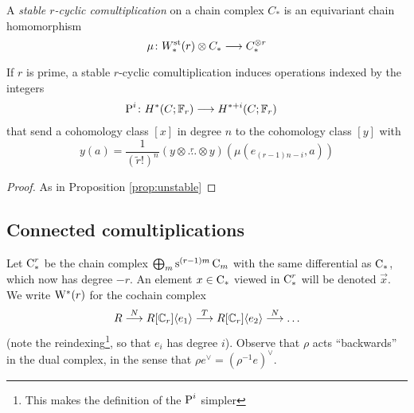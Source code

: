 A \emph{stable $r$-cyclic comultiplication} on a chain complex $C_*$ is an equivariant chain homomorphism
\[
\mu\colon W_*^{\mathrm{st}}(r)\otimes C_*\longrightarrow C_*^{\otimes r}
\]
\begin{proposition}
If $r$ is prime, a stable $r$-cyclic comultiplication induces operations indexed by the integers
\begin{align*}
    \operatorname{P}^{i}\colon H^*(C;\mathbb{F}_r)&\longrightarrow H^{*+i}(C;\mathbb{F}_r)
\end{align*}
that send a cohomology class $[x]$ in degree $n$ to the cohomology class $[y]$ with 
\[
    y(a) = \frac{1}{(\tilde{r}!)^n}(y\otimes \overset{r}{\ldots}\otimes y)(\mu(e_{(r-1)n-i},a))
\]
\end{proposition}
\begin{proof}
    As in Proposition \ref{prop:unstable}
\end{proof}

\subsection{Connected comultiplications}

Let $\operatorname{C}_*^r$ be the chain complex $\bigoplus_m \operatorname{s}^{(r-1)m}\operatorname{C}_m$ with the same differential as $\operatorname{C}_*$, which now has degree $-r$. An element $x\in \operatorname{C}_*$ viewed in $\operatorname{C}_*^r$ will be denoted $\vec{x}$. We write $\mathrm{W}^*(r)$ for the cochain complex
\[
    R\overset{N}{\longrightarrow} R[\mathbb{C}_r]\langle e_1\rangle \overset{T}{\longrightarrow} R[\mathbb{C}_r]\langle e_2\rangle \overset{N}{\longrightarrow} \ldots
\]
(note the reindexing\footnote{This makes the definition of the $\operatorname{P}^i$ simpler}, so that $e_i$ has degree $i$). Observe that $\rho$ acts ``backwards'' in the dual complex, in the sense that $\rho e^\vee = (\rho^{-1} e)^{\vee}$.


